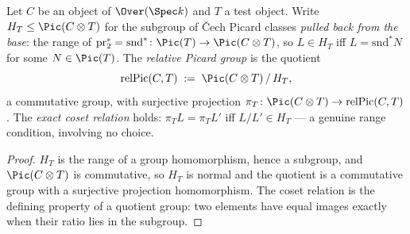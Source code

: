 \begin{definition}
  \label{def:relPic}
  \leanok
  Let \(C\) be an object of \(\Over(\Spec k)\) and \(T\) a test object. Write
  \(H_T \le \Pic(C \otimes T)\) for the subgroup of \v Cech Picard classes \emph{pulled back
  from the base}: the range of \(\mathrm{pr}_2^{*} = \mathrm{snd}^{*} \colon \Pic(T) \to
  \Pic(C \otimes T)\), so \(L \in H_T\) iff \(L = \mathrm{snd}^{*} N\) for some
  \(N \in \Pic(T)\). The \emph{relative Picard group} is the quotient
  \[
    \mathrm{relPic}(C,T) \;:=\; \Pic(C \otimes T) \,/\, H_T ,
  \]
  a commutative group, with surjective projection \(\pi_T \colon \Pic(C \otimes T) \to
  \mathrm{relPic}(C,T)\). The \emph{exact coset relation} holds: \(\pi_T L = \pi_T L'\) iff
  \(L / L' \in H_T\) — a genuine range condition, involving no choice.
\end{definition}
\begin{proof}
  \leanok
  \(H_T\) is the range of a group homomorphism, hence a subgroup, and \(\Pic(C \otimes T)\)
  is commutative, so \(H_T\) is normal and the quotient is a commutative group with a
  surjective projection homomorphism. The coset relation is the defining property of a
  quotient group: two elements have equal images exactly when their ratio lies in the
  subgroup.
\end{proof}

